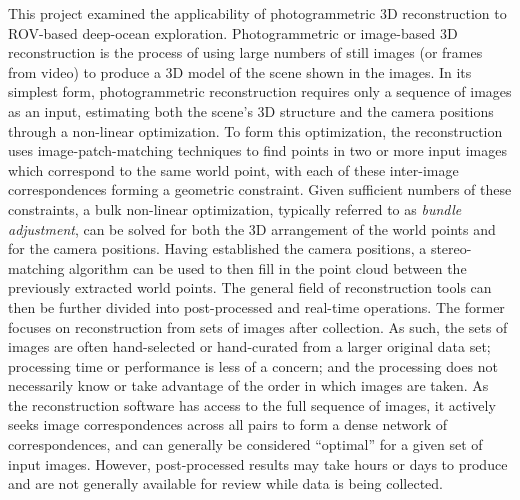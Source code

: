\documentclass[letterpaper,12pt]{article}
\begin{document}
This project examined the applicability of photogrammetric 3D reconstruction to ROV-based deep-ocean exploration.   Photogrammetric or image-based 3D reconstruction is the process of using large numbers of still images (or frames from video) to produce a 3D model of the scene shown in the images.   In its simplest form, photogrammetric reconstruction requires only a sequence of images as an input, estimating both the scene's 3D structure and the camera positions through a non-linear optimization.   To form this optimization, the reconstruction uses image-patch-matching techniques to find points in two or more input images which correspond to the same world point, with each of these inter-image correspondences forming a geometric constraint.   Given sufficient numbers of these constraints, a bulk non-linear optimization, typically referred to as \textit{bundle adjustment}, can be solved for both the 3D arrangement of the world points and for the camera positions.  Having established the camera positions, a stereo-matching algorithm can be used to then fill in the point cloud between the previously extracted world points.  The general field of reconstruction tools can then be further divided into post-processed and real-time operations.   The former focuses on reconstruction from sets of images after collection.  As such, the sets of images are often hand-selected or hand-curated from a larger original data set; processing time or performance is less of a concern; and the processing does not necessarily know or take advantage of the order in which images are taken.   As the reconstruction software has access to the full sequence of images, it actively seeks image correspondences across all pairs to form a dense network of correspondences, and can generally be considered ``optimal'' for a given set of input images.   However, post-processed results may take hours or days to produce and are not generally available for review while data is being collected.
\end{document}
